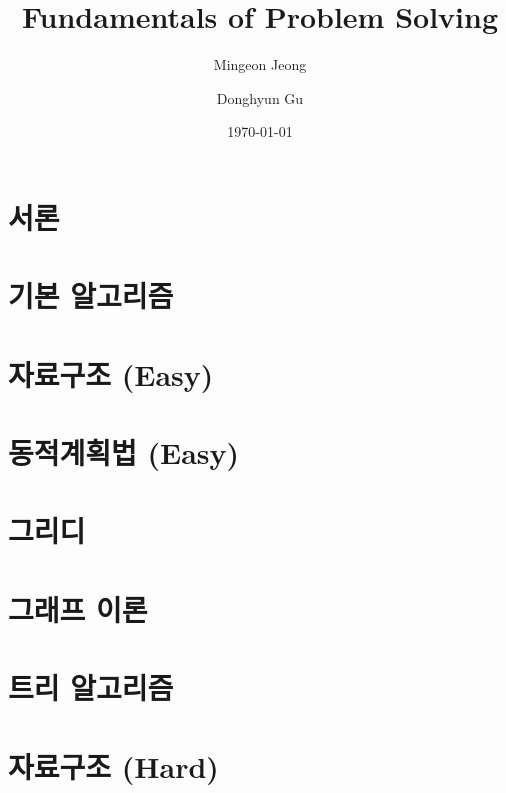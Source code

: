 \documentclass[openright, twoside, british]{book}
\title{Fundamentals of Problem Solving}
\author{Mingeon Jeong \and Donghyun Gu}
\date{\today}
\begin{document}
\frontmatter



\maketitle\pagebreak

\tableofcontents

\mainmatter

\part{서론}


\part{기본 알고리즘}


\part{자료구조 (Easy)}


\part{동적계획법 (Easy)}


\part{그리디}


\part{그래프 이론}


\part{트리 알고리즘}


\part{자료구조 (Hard)} \label{part: 8}

\end{document}
